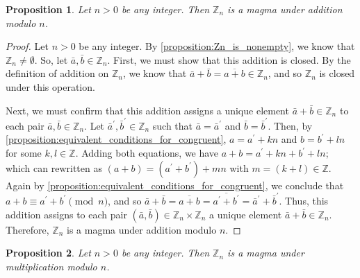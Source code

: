 \documentclass[12pt, titlepage]{amsart}
\newcommand\Z{{\mathbb Z}}
\newtheorem{prop}{Proposition}[subsection]
\theoremstyle{definition}
\begin{document}
	\begin{prop}\label{proposition:Zn_is_a_magma_under_addition_modulo_n}
		Let $n > 0$ be any integer. Then $\Z_n$ is a magma under addition modulo $n$.
	\end{prop}
	
	\begin{proof}
		Let $n > 0$ be any integer.
		By \cref{proposition:Zn_is_nonempty}, we know that $\Z_n \neq \emptyset$.
		So, let $\bar{a}, \bar{b} \in \Z_n$.
		First, we must show that this addition is closed. By the definition of addition on $\Z_n$, we know that $\bar{a} + \bar{b} = \overline{a + b} \in \Z_n$, and so $\Z_n$ is closed under this operation.
		
		Next, we must confirm that this addition assigns a unique element $\bar{a} + \bar{b} \in \Z_n$ to each pair $\bar{a},\bar{b} \in \Z_n$.		
		Let $\bar{a}^\prime,\bar{b}^\prime \in \Z_n$ such that $\bar{a} = \bar{a}^\prime$ and $\bar{b} = \bar{b}^\prime$. Then, by \cref{proposition:equivalent_conditions_for_congruent}, $a = a^\prime + kn$ and $b = b^\prime + ln$ for some $k,l \in \Z$. 
		Adding both equations, we have $a + b = a^\prime + kn + b^\prime + ln$; which can rewritten as $(a + b) = (a^\prime + b^\prime) + mn$ with $m = (k + l) \in \Z$.
		Again by \cref{proposition:equivalent_conditions_for_congruent}, we conclude that $a + b \equiv a^\prime + b^\prime \pmod n$, and so $\bar{a} + \bar{b} = \overline{a + b} = \overline{a^\prime + b^\prime} = \bar{a}^\prime + \bar{b}^\prime$.
		Thus, this addition assigns to each pair $(\bar{a},\bar{b}) \in \Z_n \times \Z_n$ a unique element $\bar{a} + \bar{b} \in \Z_n$.
		Therefore, $\Z_n$ is a magma under addition modulo $n$.
	\end{proof}

	\begin{prop}\label{proposition:Zn_is_a_magma_under_multiplication_modulo_n}
		Let $n > 0$ be any integer. Then $\Z_n$ is a magma under multiplication modulo $n$.
	\end{prop}
\end{document}
